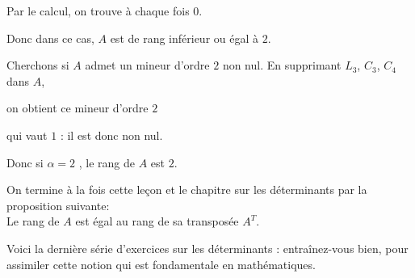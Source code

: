 \change
Par le calcul, on trouve à chaque fois $0$.

\change
Donc dans ce cas,  $A$ est de rang inférieur ou égal à $2$.

\change
Cherchons si $A$ admet un mineur d'ordre $2$ non nul. En supprimant $L_3$, $C_3$, $C_4$ dans $A$, 

\change
on obtient  ce mineur d'ordre $2$

\change
qui vaut $1$ : il est donc non nul.

\change
Donc si $\alpha = 2$ , le rang de $A$ est $2$.


\diapo

On termine à la fois cette leçon et le chapitre sur les déterminants par la proposition suivante:\\

Le rang de $A$ est égal au rang de sa transposée $A^T$.


\diapo

Voici la dernière série d'exercices sur les déterminants : entraînez-vous bien, pour assimiler cette notion qui est fondamentale en mathématiques.


